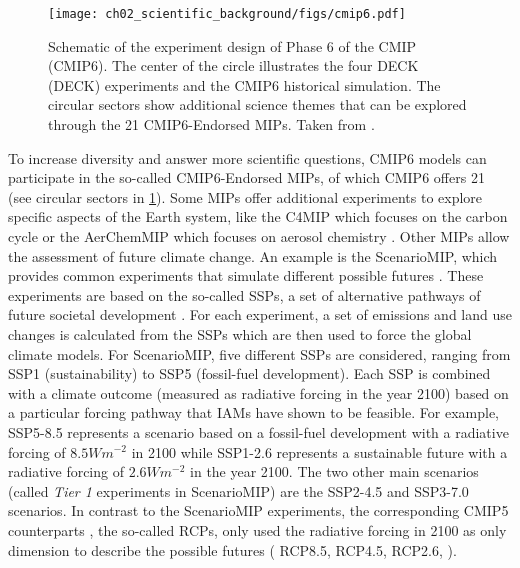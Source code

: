 \begin{figure}[t]
  \centering
  \texttt{[image: 
    ch02\_scientific\_background/figs/cmip6.pdf]}
  \caption{Schematic of the experiment design of Phase 6 of the \acl{CMIP}
    (\acs{CMIP}6). The center of the circle illustrates the four \acs{DECK}
    (\acl{DECK}) experiments and the \acs{CMIP}6 historical simulation. The
    circular sectors show additional science themes that can be explored
    through the 21 \acs{CMIP}6-Endorsed \acfp{MIP}. Taken from
    \textcite{Simpkins2017}.}
  \label{fig:02:cmip6}
\end{figure}

To increase diversity and answer more scientific questions, \acs{CMIP}6 models
can participate in the so-called \acs{CMIP}6-Endorsed \acp{MIP}, of which
\acs{CMIP}6 offers 21 (see circular sectors in \cref{fig:02:cmip6}). Some
\acp{MIP} offer additional experiments to explore specific aspects of the Earth
system, like the \ac{C4MIP} which focuses on the carbon cycle
\autocite{Jones2016} or the \ac{AerChemMIP} which focuses on aerosol chemistry
\autocite{Collins2017}. Other \acp{MIP} allow the assessment of future climate
change. An example is the \ac{ScenarioMIP}, which provides common experiments
that simulate different possible futures \autocite{ONeill2016}. These
experiments are based on the so-called \acp{SSP}, a set of alternative pathways
of future societal development \autocite{ONeill2013, ONeill2017}. For each
experiment, a set of emissions and land use changes is calculated from the
\acp{SSP} \autocite{Riahi2017} which are then used to force the global climate
models. For \ac{ScenarioMIP}, five different \acp{SSP} are considered, ranging
from \ac{SSP}1 (sustainability) to \ac{SSP}5 (fossil-fuel development). Each
\ac{SSP} is combined with a climate outcome (measured as radiative forcing in
the year 2100) based on a particular forcing pathway that \acp{IAM} have shown
to be feasible. For example, \ac{SSP}5-8.5 represents a scenario based on a
fossil-fuel development with a radiative forcing of $8.5 \unit{W m^{-2}}$ in
2100 while \ac{SSP}1-2.6 represents a sustainable future with a radiative
forcing of $2.6 \unit{W m^{-2}}$ in the year 2100. The two other main scenarios
(called \emph{Tier 1} experiments in \ac{ScenarioMIP}) are the \ac{SSP}2-4.5
and \ac{SSP}3-7.0 scenarios. In contrast to the \ac{ScenarioMIP} experiments,
the corresponding \acs{CMIP}5 counterparts \autocite{Taylor2012}, the so-called
\acp{RCP}, only used the radiative forcing in 2100 as only dimension to
describe the possible futures (\eg{} \ac{RCP}8.5, \ac{RCP}4.5, \ac{RCP}2.6,
\etc{}).

